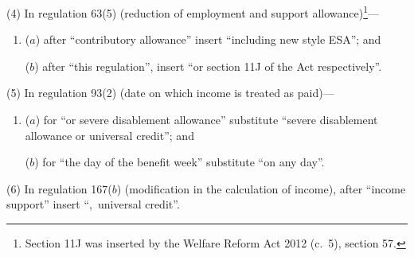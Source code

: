 \documentclass[12pt,a4paper]{article}
\begin{document}
\begin{sloppypar}
(4) In regulation 63(5) (reduction of employment and support allowance)\footnote{Section 11J was inserted by the Welfare Reform Act 2012 (c.~5), section 57.}—
\end{sloppypar}
\begin{enumerate}\item[]
($a$) after “contributory allowance” insert “including new style ESA”; and

($b$) after “this regulation”, insert “or section 11J of the Act respectively”.
\end{enumerate}

(5) In regulation 93(2) (date on which income is treated as paid)—
\begin{enumerate}\item[]
($a$) for “or severe disablement allowance” substitute “severe disablement allowance or universal credit”; and

($b$) for “the day of the benefit week” substitute “on any day”.
\end{enumerate}

(6) In regulation 167($b$)  (modification in the calculation of income), after “income support” insert “,~universal credit”.
\end{document}
